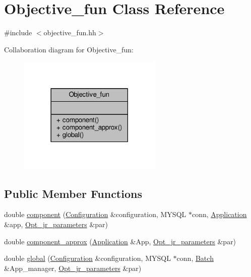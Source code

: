 \hypertarget{classObjective__fun}{\section{Objective\-\_\-fun Class Reference}
\label{classObjective__fun}
}


{\ttfamily \#include $<$objective\-\_\-fun.\-hh$>$}



Collaboration diagram for Objective\-\_\-fun\-:\nopagebreak
\begin{figure}[H]
\begin{center}
\leavevmode
\includegraphics[width=194pt]{classObjective__fun__coll__graph}
\end{center}
\end{figure}
\subsection*{Public Member Functions}
\begin{DoxyCompactItemize}
\item 
double \hyperlink{classObjective__fun_a7d98b1f4e8a741fddc249e5134d5c3ef}{component} (\hyperlink{classConfiguration}{Configuration} \&configuration, M\-Y\-S\-Q\-L $\ast$conn, \hyperlink{classApplication}{Application} \&app, \hyperlink{classOpt__jr__parameters}{Opt\-\_\-jr\-\_\-parameters} \&par)
\item 
double \hyperlink{classObjective__fun_a551109cf9927773062e9e3668c00eb59}{component\-\_\-approx} (\hyperlink{classApplication}{Application} \&App, \hyperlink{classOpt__jr__parameters}{Opt\-\_\-jr\-\_\-parameters} \&par)
\item 
double \hyperlink{classObjective__fun_ae11b3facab75a7b7dc197d0a1a194d29}{global} (\hyperlink{classConfiguration}{Configuration} \&configuration, M\-Y\-S\-Q\-L $\ast$conn, \hyperlink{classBatch}{Batch} \&App\-\_\-manager, \hyperlink{classOpt__jr__parameters}{Opt\-\_\-jr\-\_\-parameters} \&par)
\end{DoxyCompactItemize}


